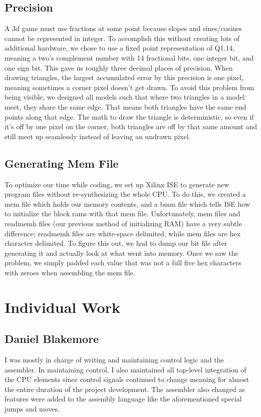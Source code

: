 \documentclass[onecolumn]{IEEEtran}
\begin{document}
\subsection{Precision}
A 3d game must use fractions at some point because slopes and sines/cosines cannot be represented in integer.  To accomplish this without creating lots of additional hardware, we chose to use a fixed point representation of Q1.14, meaning a two's complement number with 14 fractional bits, one integer bit, and one sign bit.  This gave us roughly three decimal places of precision.  When drawing triangles, the largest accumulated error by this precision is one pixel, meaning sometimes a corner pixel doesn't get drawn.  To avoid this problem from being visible, we designed all models such that where two triangles in a model meet, they share the same edge.  That means both triangles have the same end points along that edge.  The math to draw the triangle is deterministic, so even if it's off by one pixel on the corner, both triangles are off by that same amount and still meet up seamlessly instead of leaving an undrawn pixel.

\subsection{Generating Mem File}
To optimize our time while coding, we set up Xilinx ISE to generate new program files without re-synthesizing the whole CPU.  To do this, we created a mem file which holds our memory contents, and a bmm file which tells ISE how to initialize the block rams with that mem file.  Unfortunately, mem files and readmemh files (our previous method of initializing RAM) have a very subtle difference; readmemh files are white-space delimited, while mem files are hex character delimited.  To figure this out, we had to dump our bit file after generating it and actually look at what went into memory.  Once we saw the problem, we simply padded each value that was not a full five hex characters with zeroes when assembling the mem file.



\section{Individual Work}
\subsection{Daniel Blakemore}
I was mostly in charge of writing and maintaining control logic and the assembler.  In maintaining control, I also maintained all top-level integration of the CPU elements since control signals continued to change meaning for almost the entire duration of the project development.  The assembler also changed as features were added to the assembly language like the aforementioned special jumps and moves.
\end{document}
